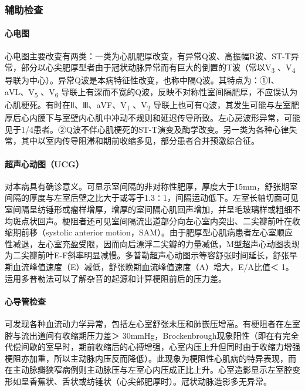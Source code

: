 \subsubsection{辅助检查}

\paragraph{心电图}

心电图主要改变有两类：一类为心肌肥厚改变，有异常Q波、高振幅R波、ST-T异常，部分以心尖肥厚型者由于冠状动脉异常而有巨大的倒置的T波（常以V\textsubscript{3}
、V\textsubscript{4}
导联为中心）。异常Q波是本病特征性改变，也称中隔Q波。其特点为：①I、aVL、V\textsubscript{5}
、V\textsubscript{6}
导联上有深而不宽的Q波，反映不对称性室间隔肥厚，不应误认为心肌梗死。有时在Ⅱ、Ⅲ、aVF、V\textsubscript{1}
、V\textsubscript{2}
导联上也可有Q波，其发生可能与左室肥厚后心内膜下与室壁内心肌中冲动不规则和延迟传导所致。左心房波形异常，可能见于1/4患者。②Q波不伴心肌梗死的ST-T演变及酶学改变。另一类为各种心律失常，其中以室内传导阻滞和期前收缩多见，部分患者合并预激综合征。

\paragraph{超声心动图（UCG）}

对本病具有确诊意义。可显示室间隔的非对称性肥厚，厚度大于15mm，舒张期室间隔的厚度与左室后壁之比大于或等于1.3∶1，间隔运动低下。左室长轴切面可见室间隔呈纺锤形或瘤样增厚，增厚的室间隔心肌回声增加，并呈毛玻璃样或粗细不均斑点状回声。梗阻者还可见室间隔流出道部分向左心室内突出、二尖瓣前叶在收缩期前移（systolic
anterior
motion，SAM）。由于肥厚型心肌病患者左心室顺应性减退，左心室充盈受限，因而向后漂浮二尖瓣的力量减低，M型超声心动图表现为二尖瓣前叶E-F斜率明显减慢。多普勒超声心动图示等容舒张时间延长，舒张早期血流峰值速度（E）减低，舒张晚期血流峰值速度（A）增大，E/A比值＜
1。运用多普勒法可以了解杂音的起源和计算梗阻前后的压力差。

\paragraph{心导管检查}

可发现各种血流动力学异常，包括左心室舒张末压和肺嵌压增高。有梗阻者在左室腔与流出道间有收缩期压力差＞
30mmHg，Brockenbrough现象阳性（即在有完全代偿间歇的室早时，期前收缩后的心搏增强，心室内压上升但同时由于收缩力增强梗阻亦加重，所以主动脉内压反而降低）。此现象为梗阻性心肌病的特异表现，而在主动脉瓣狭窄病例则主动脉压与左室心内压成正比上升。心室造影显示左室腔变形如呈香蕉状、舌状或纺锤状（心尖部肥厚时）。冠状动脉造影多无异常。

